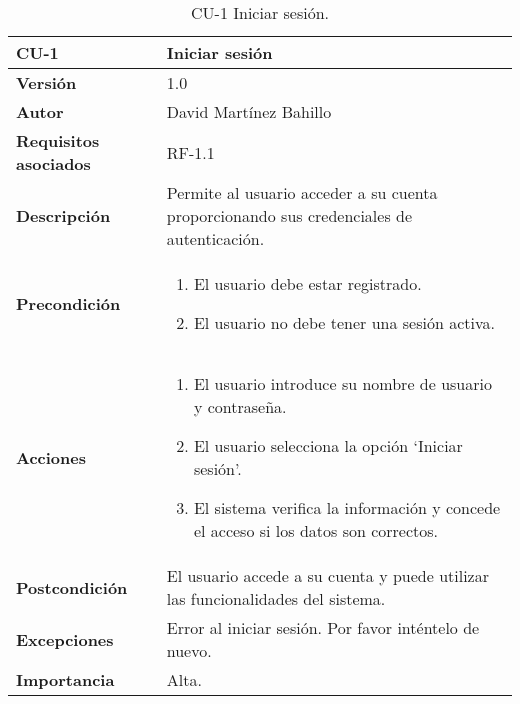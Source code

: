 \begin{table}[p]
	\centering
	\begin{tabularx}{\linewidth}{ p{} p{} }
		\toprule
		\textbf{CU-1}    & \textbf{Iniciar sesión}\\
		\toprule
		\textbf{Versión}              & 1.0    \\
		\textbf{Autor}                & David Martínez Bahillo \\
		\textbf{Requisitos asociados} & RF-1.1 \\
		\textbf{Descripción}          & Permite al usuario acceder a su cuenta proporcionando sus credenciales de autenticación. \\
		\textbf{Precondición}         &  
		\begin{enumerate}
		\def\labelenumi{\arabic{enumi}.}
			\tightlist
			\item El usuario debe estar registrado.
			\item El usuario no debe tener una sesión activa.
		\end{enumerate}\\
		\textbf{Acciones}             &
		\begin{enumerate}
			\def\labelenumi{\arabic{enumi}.}
			\tightlist
			\item El usuario introduce su nombre de usuario y contraseña.
			\item El usuario selecciona la opción `Iniciar sesión'.
			\item El sistema verifica la información y concede el acceso si los datos son correctos.
		\end{enumerate}\\
		\textbf{Postcondición}        & El usuario accede a su cuenta y puede utilizar las funcionalidades del sistema. \\
		\textbf{Excepciones}          & Error al iniciar sesión. Por favor inténtelo de nuevo. \\
		\textbf{Importancia}          & Alta.  \\
		\bottomrule
	\end{tabularx}
	\caption{CU-1 Iniciar sesión.}
\end{table}




